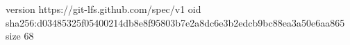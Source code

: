 version https://git-lfs.github.com/spec/v1
oid sha256:d03485325f05400214db8e8f95803b7e2a8dc6e3b2edcb9bc88ea3a50e6aa865
size 68
